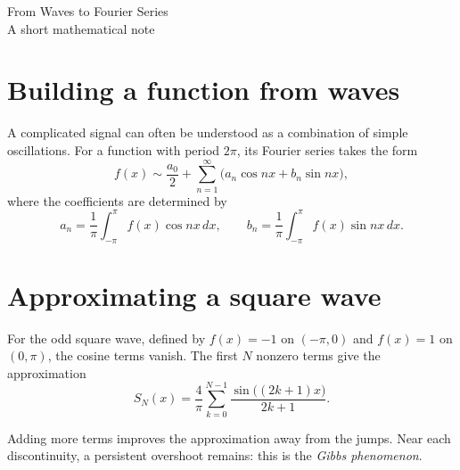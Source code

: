 \documentclass[11pt,a4paper]{article}
\begin{document}
\begin{center}
  {\LARGE From Waves to Fourier Series}\\[0.5em]
  {\small A short mathematical note}
\end{center}

\section{Building a function from waves}
A complicated signal can often be understood as a combination
of simple oscillations. For a function with period $2\pi$,
its Fourier series takes the form
\begin{equation}
  f(x) \sim \frac{a_0}{2}
  + \sum_{n=1}^{\infty}
    \bigl(a_n\cos nx + b_n\sin nx\bigr),
\end{equation}
where the coefficients are determined by
\begin{equation}
  a_n = \frac{1}{\pi}\int_{-\pi}^{\pi}f(x)\cos nx\,dx,
  \qquad
  b_n = \frac{1}{\pi}\int_{-\pi}^{\pi}f(x)\sin nx\,dx.
\end{equation}

\section{Approximating a square wave}
For the odd square wave, defined by $f(x)=-1$ on $(-\pi,0)$
and $f(x)=1$ on $(0,\pi)$, the cosine terms vanish.
The first $N$ nonzero terms give the approximation
\begin{equation}
  S_N(x)=\frac{4}{\pi}\sum_{k=0}^{N-1}
  \frac{\sin\bigl((2k+1)x\bigr)}{2k+1}.
\end{equation}

\begin{center}
\end{center}

Adding more terms improves the approximation away from the jumps.
Near each discontinuity, a persistent overshoot remains:
this is the \emph{Gibbs phenomenon}.
\end{document}
